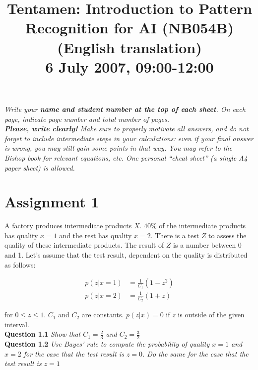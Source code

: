 \documentclass[a4paper]{article}
\begin{document}
\title{Tentamen: Introduction to Pattern Recognition for AI (NB054B)\\(English translation)\\ \vspace{1em}6 July 2007, 09:00-12:00 }
\date{}
\maketitle

\vspace{-5em}
\textit{Write your \textbf{name and student number at the top of each sheet}. On each page, indicate page number and total number of pages.\\
\textbf{Please, write clearly!} Make sure to properly motivate all answers, and do not
forget to include intermediate steps in your calculations: even if your final answer is
wrong, you may still gain some points in that way. You may refer to the Bishop book
for relevant equations, etc. One personal “cheat sheet” (a single A4 paper sheet) is
allowed.}\\





\section*{Assignment 1}

A factory produces intermediate products $X$. $40 \%$ of the intermediate products has quality $x = 1$ and the rest has quality $x = 2$. There is a test $Z$ to assess the quality of these intermediate products. The result of $Z$ is a number between 0 and 1. Let's assume that the test result, dependent on the quality is distributed as follows:

\begin{align*}
	p(z | x = 1) &= \frac{1}{C_1} (1 - z^2)\\
	p(z | x = 2) &= \frac{1}{C_2} (1 + z)
\end{align*}

for $0 \leq z \leq 1$. $C_1$ and $C_2$ are constants. $p(z | x) = 0$ if $z$ is outside of the given interval.\\

\textbf{Question 1.1}  \textit{Show that $C_1 = \frac{2}{3}$ and $C_2 = \frac{3}{2}$}\\


\textbf{Question 1.2}  \textit{Use Bayes' rule to compute the probability of quality $x = 1$ and $x = 2$ for the case that the test result is $z = 0$. Do the same for the case that the test result is $z = 1$}\\
\end{document}
